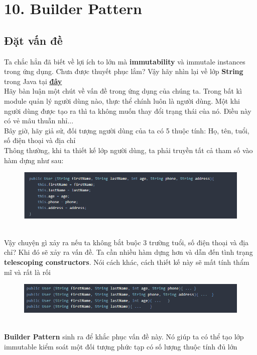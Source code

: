 \chapter{10. Builder Pattern}
\section{Đặt vấn đề}
Ta chắc hẳn đã biết về lợi ích to lớn mà \textbf{immutability} và immutale instances trong ứng dụng. Chưa được thuyết phục lắm? Vậy hãy nhìn lại về lớp \textbf{String} trong Java tại \href{https://howtodoinjava.com/java/string/java-interview-question-why-strings-are-immutable/}{\textbf{đây}}\\[0.1in]
Hãy bàn luận một chút về vấn đề trong ứng dụng của chúng ta. Trong bất kì module quản lý người dùng nào, thực thể chính luôn là người dùng. Một khi người dùng được tạo ra thì ta không muốn thay đổi trạng thái của nó. Điều này có vẻ mâu thuẫn nhỉ...\\[0.1in]
Bây giờ, hãy giả sử, đối tượng người dùng của ta có 5 thuộc tính: Họ, tên, tuổi, số điện thoại và địa chỉ\\[0.1in]
Thông thường, khi ta thiết kế lớp người dùng, ta phải truyền tất cả tham số vào hàm dựng như sau:\\[0.1in]
\begin{figure}[!htb]
    \centering
    \includegraphics[width=\textwidth]{fig/Builder/UserNormalDesign.png}
\end{figure}\\[0.1in]
Vậy chuyện gì xảy ra nếu ta không bắt buộc 3 trường tuổi, số điện thoại và địa chỉ? Khi đó sẽ xảy ra vấn đề. Ta cần nhiều hàm dựng hơn và dẫn đến tình trạng \textbf{telescoping constructors}. Nói cách khác, cách thiết kế này sẽ mất tính thẩm mĩ và rất là rối
\begin{figure}[!htb]
    \centering
    \includegraphics[width=\textwidth]{fig/Builder/UglyDesign.png}
\end{figure}\\[0.1in]
\textbf{Builder Pattern} sinh ra để khắc phục vấn đề này. Nó giúp ta có thể tạo lớp immutable kiểm soát một đối tượng phức tạp có số lượng thuộc tính đủ lớn
